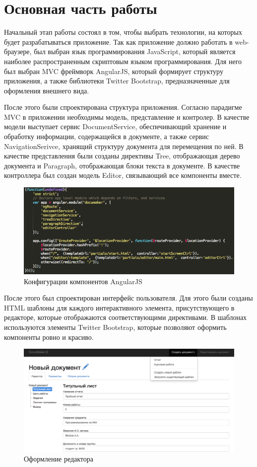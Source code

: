 \documentclass[14pt,a4paper]{report}
\makeatletter
\newif\if@prechapterused
\let\oldchapter\chapter
\renewcommand{\chapter}[1]
{
\if@prechapterused\vspace{-2em}\@prechapterusedfalse\fi
\begingroup
	\let\clearpage\relax
	\let\cleardoublepage\relax
	\oldchapter{#1}
\endgroup
}
\makeatother
\begin{document}
\chapter{Основная часть работы}
Начальный этап работы состоял в том, чтобы выбрать технологии, на которых будет разрабатываться приложение. Так как приложение должно работать в web-браузере, был выбран язык программирования JavaScript, который является наиболее распространенным скриптовым языком программирования. Для него был выбран MVC фреймворк AngularJS, который формирует структуру приложения, а также библиотеки Twitter Bootstrap, предназначенные для оформления внешнего вида.

После этого были спроектирована структура приложения. Согласно парадигме MVC в приложении необходимы модель, представление и контролер. В качестве модели выступает сервис DocumentService, обеспечивающий хранение и обработку информации, содержащейся в документе, а также сервис NavigationSerivce, хранящий структуру документа для перемещения по ней. В качестве представления были созданы директивы Tree, отображающая дерево документа и Paragraph, отображающая блоки текста в документе. В качестве контроллера был создан модель Editor, связывающий все компоненты вместе.

\begin{figure}[H]
\centerline{\includegraphics[scale=0.4]{gfx/1.png}}
\caption{Конфигурации компонентов AngularJS}
\label{fig1}
\end{figure}

После этого был спроектирован интерфейс пользователя. Для этого были созданы HTML шаблоны для каждого интерактивного элемента, присутствующего в редакторе, которые отображаются соответствующими директивами. В шаблонах используются элементы Twitter Bootstrap, которые позволяют оформить компоненты ровно и красиво.

\begin{figure}[H]
\centerline{\includegraphics[scale=0.4]{gfx/2.png}}
\caption{Оформление редактора}
\label{fig2}
\end{figure}
\end{document}
